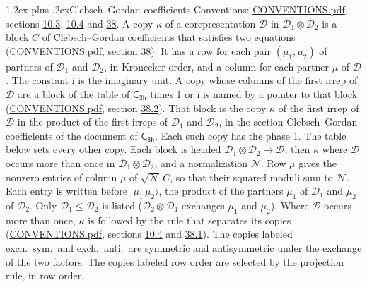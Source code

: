 \documentclass[10pt,a4paper]{article}
\makeatletter
\renewcommand\section{\@startsection{section}{1}{\z@}{-3ex plus -1ex minus -.2ex}%
  {1.2ex plus .2ex}{\normalfont\large\sffamily\bfseries\color{parttitle}}}
\numberwithin{equation}{section}
\newcommand{\grp}[1]{\mathsf{#1}}
\newcommand{\iunit}{\mathrm{i}}
\newcommand{\irrprod}{\otimes}
\newcommand{\mult}{\kappa}
\newcommand{\intx}{\mu}
\newcommand{\cgnorm}{\mathcal{N}}
\newcommand{\prodket}[2]{\lvert {#1}\,{#2}\rangle}
\makeatother
\begin{document}
\section{Clebsch--Gordan coefficients}\label{s:clebsch_gordan}
Conventions: \href{../../CONVENTIONS.pdf}{CONVENTIONS.pdf}, sections \href{../../../rotation/CONVENTIONS.pdf\#conv.10.3}{10.3}, \href{../../../rotation/CONVENTIONS.pdf\#conv.10.4}{10.4} and \href{../../CONVENTIONS.pdf\#conv.38}{38}.
\leavevmode\label{n:index.copy}\label{n:matrix.cg.stored}A copy $\mult$ of a corepresentation $\mathcal{D}$ in $\mathcal{D}_1\irrprod\mathcal{D}_2$ is a block $C$ of Clebsch--Gordan coefficients that satisfies two equations (\href{../../CONVENTIONS.pdf}{CONVENTIONS.pdf}, section \href{../../CONVENTIONS.pdf\#conv.38}{38}). \label{n:index.cg}It has a row for each pair $(\intx_1, \intx_2)$ of partners of $\mathcal{D}_1$ and $\mathcal{D}_2$, in Kronecker order, and a column for each partner $\intx$ of $\mathcal{D}$.
The constant $\iunit$ is the imaginary unit.
A copy whose columns of the first irrep of $\mathcal{D}$ are a block of the table of $\grp{C_{3h}}$ times 1 or $\iunit$ is named by a pointer to that block (\href{../../CONVENTIONS.pdf}{CONVENTIONS.pdf}, section \href{../../CONVENTIONS.pdf\#conv.38.2}{38.2}). That block is the copy $\mult$ of the first irrep of $\mathcal{D}$ in the product of the first irreps of $\mathcal{D}_1$ and $\mathcal{D}_2$, in the section Clebsch--Gordan coefficients of the document of \href{../../../rotation/data/pdf/C3h.pdf}{$\grp{C_{3h}}$}. Each such copy has the phase 1. The table below sets every other copy.
Each block is headed $\mathcal{D}_1\irrprod\mathcal{D}_2\to\mathcal{D}$, then $\mult$ where $\mathcal{D}$ occurs more than once in $\mathcal{D}_1\irrprod\mathcal{D}_2$, and a normalization $\cgnorm$. Row $\intx$ gives the nonzero entries of column $\intx$ of $\sqrt{\cgnorm}\,C$, so that their squared moduli sum to $\cgnorm$. \label{n:vector.ket.product}Each entry is written before $\prodket{\intx_1}{\intx_2}$, the product of the partners $\intx_1$ of $\mathcal{D}_1$ and $\intx_2$ of $\mathcal{D}_2$. Only $\mathcal{D}_1 \le \mathcal{D}_2$ is listed ($\mathcal{D}_2\irrprod\mathcal{D}_1$ exchanges $\intx_1$ and $\intx_2$).
Where $\mathcal{D}$ occurs more than once, $\mult$ is followed by the rule that separates its copies (\href{../../CONVENTIONS.pdf}{CONVENTIONS.pdf}, sections \href{../../../rotation/CONVENTIONS.pdf\#conv.10.4}{10.4} and \href{../../CONVENTIONS.pdf\#conv.38.1}{38.1}). \label{n:abbreviation.exchange}The copies labeled exch.\ sym.\ and exch.\ anti.\ are symmetric and antisymmetric under the exchange of the two factors. The copies labeled row order are selected by the projection rule, in row order.
\end{document}
